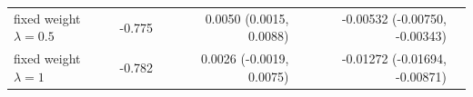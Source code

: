 \begin{tabular}{lrrrrrr}
fixed weight $\lambda = 0.5$ & -0.775 &  & 0.0050 (0.0015, 0.0088) &  & -0.00532 (-0.00750, -0.00343) &  \\
fixed weight $\lambda = 1$ & -0.782 &  & 0.0026 (-0.0019, 0.0075) &  & -0.01272 (-0.01694, -0.00871) &  \\

\end{tabular}
